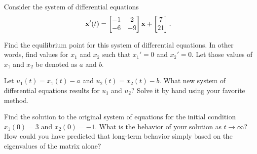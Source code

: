 \documentclass[boxes,printing,blanks,hmc]{gsypset}
\begin{document}
\begin{problem}
	Consider the system of differential equations
	\[
		\mathbf{x}'(t) = \begin{bmatrix}-1 & 2 \\ -6 & -9\end{bmatrix} \mathbf{x} + \begin{bmatrix}7 \\ 21\end{bmatrix}.
	\]
	\begin{subproblems}
		\subproblem
			Find the equilibrium point for this system of differential equations. 
			In other words, find values for $x_1$ and $x_2$ such that $x_1'=0$ and $x_2'=0$. 
			Let those values of $x_1$ and $x_2$ be denoted as $a$ and $b$.
			\begin{solution}
				
			\end{solution}
		\subproblem 
			Let $u_1(t)=x_1(t)-a$ and $u_2(t)=x_2(t)-b$. 
			What new system of differential equations results for $u_1$ and $u_2$? 
			Solve it by hand using your favorite method.
			\begin{solution}
				
			\end{solution}
		\subproblem 
			Find the solution to the original system of equations 
			for the initial condition $x_1(0)=3$ and $x_2(0)=-1$. 
			What is the behavior of your solution as $t\to\infty$? 
			How could you have predicted that long-term behavior 
			simply based on the eigenvalues of the matrix alone?
			\begin{solution}
				
			\end{solution}
	\end{subproblems}
\end{problem}
\end{document}
